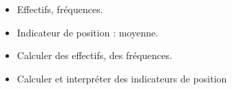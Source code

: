 \begin{prerequis}    
    \begin{itemize}        
        \item[\emoji{red-heart}] Effectifs, fréquences.
        \item[\emoji{red-heart}] Indicateur de position : moyenne.
        \item[\emoji{diamond-suit}] Calculer des effectifs, des fréquences.
        \item[\emoji{diamond-suit}] Calculer et interpréter des indicateurs de position
    \end{itemize}
\end{prerequis}
